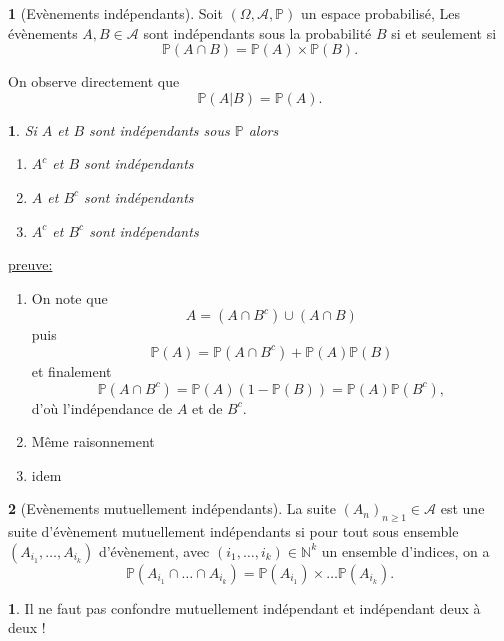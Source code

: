 \documentclass[8pt,notheorems]{beamer}
\def \N{\mathbb N}
\def \P {\mathbb P}
\newtheorem{prop}{\translate{Proposition}}
\theoremstyle{definition}
\newtheorem{definition}{\translate{Definition}}
\theoremstyle{example}
\newtheorem{example}{\translate{Exemple}}
\theoremstyle{mystyle}
\theoremstyle{plain}
\begin{document}
\begin{frame}[allowframebreaks]
\begin{definition}[Evènements indépendants]
Soit $(\Omega, \mathcal{A},\P)$ un espace probabilisé,  Les évènements $A,B\in\mathcal{A}$ sont indépendants sous la probabilité $B$ si et seulement si
$$
\P(A\cap B ) = \P(A)\times \P(B).
$$
\end{definition}
On observe directement que 
$$
\P(A|B) = \P(A).
$$
\begin{prop}
Si $A$ et $B$ sont indépendants sous $\P$ alors 
\begin{enumerate}
    \item $A^c$ et $B$ sont indépendants
    \item $A$ et $B^c$ sont indépendants
    \item $A^c$ et $B^c$ sont indépendants
\end{enumerate}
\end{prop}
\underline{preuve:}
\begin{enumerate}
    \item On note que 
    $$
    A = (A\cap B^c)\cup(A\cap B)
    $$
    puis 
    $$
    \P(A) = \P(A\cap B^c) + \P(A)\P(B)
    $$
    et finalement 
    $$
    \P(A\cap B^c) = \P(A)(1-\P(B)) = \P(A)\P(B^c), 
    $$
    d'où l'indépendance de $A$ et de $B^c$. 
    \item Même raisonnement
    \item idem
\end{enumerate}
\begin{definition}[Evènements mutuellement indépendants]
La suite $(A_n)_{n\geq1}\in \mathcal{A}$ est une suite d'évènement mutuellement indépendants si 
pour tout sous ensemble $(A_{i_1},\ldots, A_{i_k})$ d'évènement, avec $(i_1,\ldots, i_k)\in \N^k$ un ensemble d'indices, on a
$$
\P(A_{i_1}\cap\ldots\cap A_{i_k}) = \P(A_{i_1})\times\ldots \P(A_{i_k}). 
$$
\end{definition}
\begin{example}
Il ne faut pas confondre mutuellement indépendant et indépendant deux à deux !\\


\end{example}
\end{frame}
\end{document}
